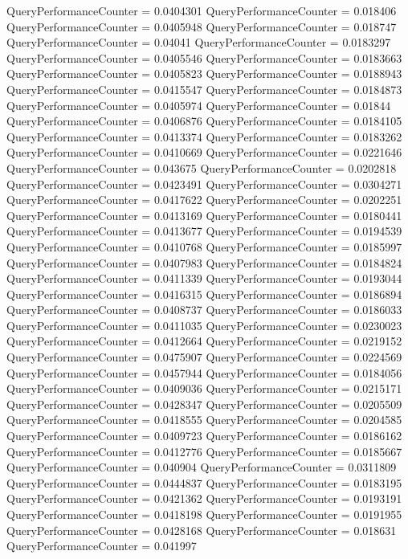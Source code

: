 \documentclass[9pt]{article}
\theoremstyle{plain}
\theoremstyle{definition}
\theoremstyle{remark}
\numberwithin{equation}{section}
\begin{document}
QueryPerformanceCounter  =  0.0404301
QueryPerformanceCounter  =  0.018406
QueryPerformanceCounter  =  0.0405948
QueryPerformanceCounter  =  0.018747
QueryPerformanceCounter  =  0.04041
QueryPerformanceCounter  =  0.0183297
QueryPerformanceCounter  =  0.0405546
QueryPerformanceCounter  =  0.0183663
QueryPerformanceCounter  =  0.0405823
QueryPerformanceCounter  =  0.0188943
QueryPerformanceCounter  =  0.0415547
QueryPerformanceCounter  =  0.0184873
QueryPerformanceCounter  =  0.0405974
QueryPerformanceCounter  =  0.01844
QueryPerformanceCounter  =  0.0406876
QueryPerformanceCounter  =  0.0184105
QueryPerformanceCounter  =  0.0413374
QueryPerformanceCounter  =  0.0183262
QueryPerformanceCounter  =  0.0410669
QueryPerformanceCounter  =  0.0221646
QueryPerformanceCounter  =  0.043675
QueryPerformanceCounter  =  0.0202818
QueryPerformanceCounter  =  0.0423491
QueryPerformanceCounter  =  0.0304271
QueryPerformanceCounter  =  0.0417622
QueryPerformanceCounter  =  0.0202251
QueryPerformanceCounter  =  0.0413169
QueryPerformanceCounter  =  0.0180441
QueryPerformanceCounter  =  0.0413677
QueryPerformanceCounter  =  0.0194539
QueryPerformanceCounter  =  0.0410768
QueryPerformanceCounter  =  0.0185997
QueryPerformanceCounter  =  0.0407983
QueryPerformanceCounter  =  0.0184824
QueryPerformanceCounter  =  0.0411339
QueryPerformanceCounter  =  0.0193044
QueryPerformanceCounter  =  0.0416315
QueryPerformanceCounter  =  0.0186894
QueryPerformanceCounter  =  0.0408737
QueryPerformanceCounter  =  0.0186033
QueryPerformanceCounter  =  0.0411035
QueryPerformanceCounter  =  0.0230023
QueryPerformanceCounter  =  0.0412664
QueryPerformanceCounter  =  0.0219152
QueryPerformanceCounter  =  0.0475907
QueryPerformanceCounter  =  0.0224569
QueryPerformanceCounter  =  0.0457944
QueryPerformanceCounter  =  0.0184056
QueryPerformanceCounter  =  0.0409036
QueryPerformanceCounter  =  0.0215171
QueryPerformanceCounter  =  0.0428347
QueryPerformanceCounter  =  0.0205509
QueryPerformanceCounter  =  0.0418555
QueryPerformanceCounter  =  0.0204585
QueryPerformanceCounter  =  0.0409723
QueryPerformanceCounter  =  0.0186162
QueryPerformanceCounter  =  0.0412776
QueryPerformanceCounter  =  0.0185667
QueryPerformanceCounter  =  0.040904
QueryPerformanceCounter  =  0.0311809
QueryPerformanceCounter  =  0.0444837
QueryPerformanceCounter  =  0.0183195
QueryPerformanceCounter  =  0.0421362
QueryPerformanceCounter  =  0.0193191
QueryPerformanceCounter  =  0.0418198
QueryPerformanceCounter  =  0.0191955
QueryPerformanceCounter  =  0.0428168
QueryPerformanceCounter  =  0.018631
QueryPerformanceCounter  =  0.041997
\end{document}

